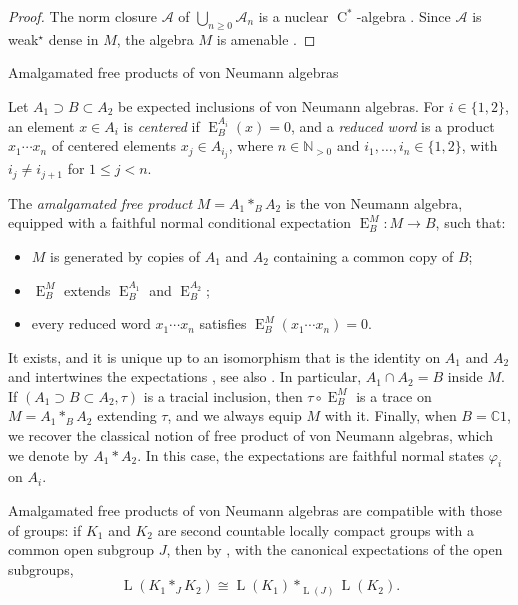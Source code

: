 \documentclass[11pt]{amsart}
\makeatletter
\numberwithin{equation}{section}
\def\subsection{\@startsection{subsection}{2}%
  \z@{.7\linespacing\@plus.7\linespacing}{.3\linespacing}%
  {\normalfont\bfseries}}
\renewcommand{\phi}{\varphi}
\newcommand{\nn}{\mathbb N}
\newcommand{\cc}{\mathbb C}
\newcommand{\A}{\mathcal A}
\DeclareMathOperator{\LL}{L}
\newcommand{\Cstar}{\operatorname{C}^*}
\newcommand{\rE}{\operatorname{E}}
\theoremstyle{definition}
\makeatother
\begin{document}
\begin{proof}
    The norm closure $\A$ of $\bigcup_{n\geq0}\A_n$ is a nuclear $\Cstar$-algebra \cite[Corollary~2.2]{KV92}. Since $\A$ is weak$^\star$ dense in $M$, the algebra $M$ is amenable \cite[Theorem~IV.2.2.13]{Bl06}.
\end{proof}


\subsection{Amalgamated free products of von Neumann algebras}
\label{subsec:prelim-afp}

Let $A_1\supset B\subset A_2$ be expected inclusions of von Neumann algebras. For $i\in\{1,2\}$, an element $x\in A_i$ is \emph{centered} if $\rE_B^{A_i}(x)=0$, and a \emph{reduced word} is a product $x_1\cdots x_n$ of centered elements $x_j\in A_{i_j}$, where $n\in\nn_{>0}$ and $i_1,\ldots,i_n\in\{1,2\}$, with $i_j\neq i_{j+1}$ for $1\leq j<n$. 

The \emph{amalgamated free product} $M=A_1\ast_B A_2$ is the von Neumann algebra, equipped with a faithful normal conditional expectation $\rE_B^M\colon M\to B$, such that:
\begin{itemize}
    \item $M$ is generated by copies of $A_1$ and $A_2$ containing a common copy of $B$;
    \item $\rE_B^M$ extends $\rE_B^{A_1}$ and $\rE_B^{A_2}$;
    \item every reduced word $x_1\cdots x_n$ satisfies $\rE_B^M(x_1\cdots x_n)=0$.
\end{itemize}
It exists, and it is unique up to an isomorphism that is the identity on $A_1$ and $A_2$ and intertwines the expectations \cite{Vo85}, see also \cite{Ue99}. In particular, $A_1\cap A_2=B$ inside $M$.
If $(A_1\supset B\subset A_2,\tau)$ is a tracial inclusion, then $\tau\circ\rE_B^M$ is a trace on $M=A_1\ast_BA_2$ extending $\tau$, and we always equip $M$ with it. Finally, when $B=\cc1$, we recover the classical notion of free product of von Neumann algebras, which we denote by $A_1\ast A_2$. In this case, the expectations are faithful normal states $\phi_i$ on $A_i$.



Amalgamated free products of von Neumann algebras are compatible with those of groups: if $K_1$ and $K_2$ are second countable locally compact groups with a common open subgroup $J$, then by \cite[Proposition~2.22]{HR19}, with the canonical expectations of the open subgroups,
\begin{equation}\label{eq:compact-amalgam-afp}
    \LL(K_1\ast_{J}K_2)\cong\LL(K_1)\ast_{\LL(J)}\LL(K_2).
\end{equation}
\end{document}

